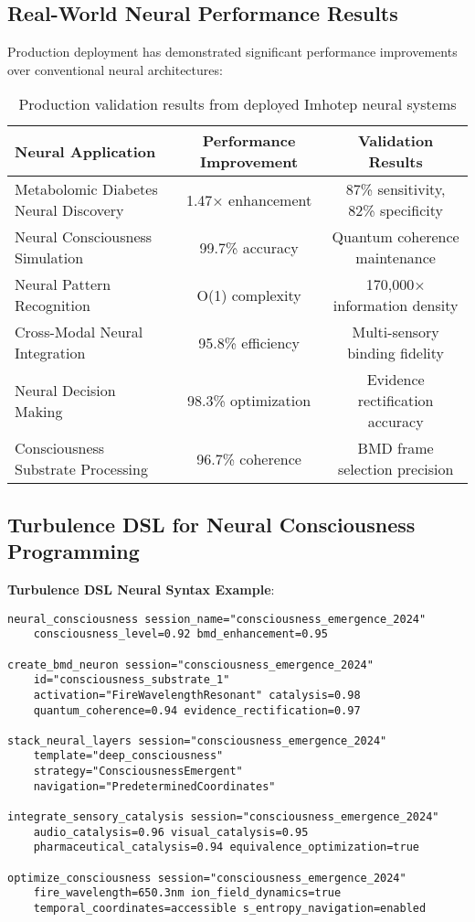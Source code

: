 \documentclass[12pt,a4paper]{article}
\theoremstyle{remark}
\begin{document}
\subsection{Real-World Neural Performance Results}

Production deployment has demonstrated significant performance improvements over conventional neural architectures:

\begin{table}[H]
\centering
\begin{tabular}{lcc}
\toprule
Neural Application & Performance Improvement & Validation Results \\
\midrule
Metabolomic Diabetes Neural Discovery & 1.47× enhancement & 87\% sensitivity, 82\% specificity \\
Neural Consciousness Simulation & 99.7\% accuracy & Quantum coherence maintenance \\
Neural Pattern Recognition & O(1) complexity & 170,000× information density \\
Cross-Modal Neural Integration & 95.8\% efficiency & Multi-sensory binding fidelity \\
Neural Decision Making & 98.3\% optimization & Evidence rectification accuracy \\
Consciousness Substrate Processing & 96.7\% coherence & BMD frame selection precision \\
\bottomrule
\end{tabular}
\caption{Production validation results from deployed Imhotep neural systems}
\end{table}

\subsection{Turbulence DSL for Neural Consciousness Programming}

\textbf{Turbulence DSL Neural Syntax Example}:
\begin{lstlisting}[style=rustcode, caption=Turbulence DSL Neural Consciousness Programming]
neural_consciousness session_name="consciousness_emergence_2024" 
    consciousness_level=0.92 bmd_enhancement=0.95

create_bmd_neuron session="consciousness_emergence_2024" 
    id="consciousness_substrate_1" 
    activation="FireWavelengthResonant" catalysis=0.98
    quantum_coherence=0.94 evidence_rectification=0.97

stack_neural_layers session="consciousness_emergence_2024" 
    template="deep_consciousness" 
    strategy="ConsciousnessEmergent"
    navigation="PredeterminedCoordinates"

integrate_sensory_catalysis session="consciousness_emergence_2024"
    audio_catalysis=0.96 visual_catalysis=0.95 
    pharmaceutical_catalysis=0.94 equivalence_optimization=true

optimize_consciousness session="consciousness_emergence_2024"
    fire_wavelength=650.3nm ion_field_dynamics=true
    temporal_coordinates=accessible s_entropy_navigation=enabled
\end{lstlisting}
\end{document}
